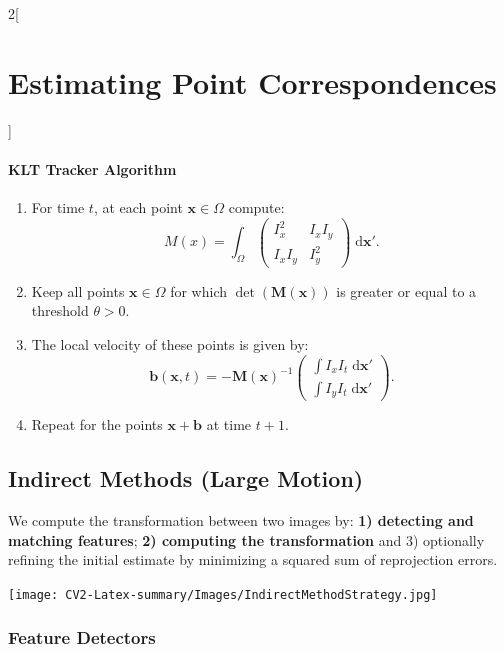\documentclass[oneside,fontsize=11pt,paper=a4]{scrartcl}
\newenvironment{myfigure}
  {\par\medskip\noindent\minipage{\linewidth}}
  {\endminipage\par\medskip}
\begin{document}
\begin{multicols}{2}[\section{Estimating Point Correspondences}]
\paragraph{KLT Tracker Algorithm}

\begin{enumerate}
    \item For time $t$, at each point $\mathbf{x} \in \Omega$ compute:
    \begin{equation*}
    M(x) = \int_{\Omega} \begin{pmatrix}I_x^2 & I_xI_y\\I_xI_y & I_y^2 \end{pmatrix} \;\mathrm{d}\mathbf{x}'.
    \end{equation*}
    \item Keep all points $\mathbf{x} \in \Omega$ for which $\det(\mathbf{M}(\mathbf{x}))$ is greater or equal to a threshold $\theta > 0$.
    \item The local velocity of these points is given by:
    \begin{equation*}
        \mathbf{b}(\mathbf{x}, t) = -\mathbf{M}(\mathbf{x})^{-1} \begin{pmatrix}\int I_xI_t \;\mathrm{d}\mathbf{x}'\\ \int I_yI_t \;\mathrm{d}\mathbf{x}' \end{pmatrix}.
    \end{equation*}
    \item Repeat for the points $\mathbf{x}+\mathbf{b}$ at time $t+1$.
\end{enumerate}

\subsection{Indirect Methods (Large Motion)} 

We compute the transformation between two images by: \textbf{1) detecting and matching features}; \textbf{2) computing the transformation} and 3) optionally refining the initial estimate by minimizing a squared sum of reprojection errors.

\begin{myfigure}
    \texttt{[image: CV2-Latex-summary/Images/IndirectMethodStrategy.jpg]}
\end{myfigure}

\subsubsection{Feature Detectors} 


\end{multicols}
\end{document}

